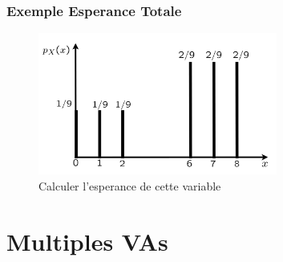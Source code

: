 \documentclass{beamer}
\begin{document}
\begin{frame}[t]
  \frametitle{Exemple Esperance Totale}
 \begin{figure}[htpb]
   \centering
   \includegraphics[width=0.7\textwidth]{./esperance_total_example.png}
   \caption{Calculer l'esperance de cette variable}
 \end{figure} 
 \pause
\end{frame}
\section{Multiples VAs}
\end{document}
